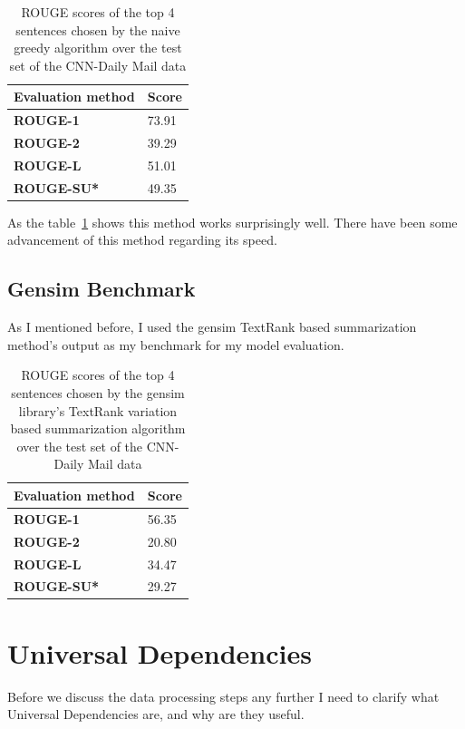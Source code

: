 \begin{table}[!ht]
	\centering
	\begin{tabular}{| l | l |}
		\hline
		\textbf{Evaluation method}&\textbf{Score}\\ \hline \hline
		\textbf{ROUGE-1}&73.91\\ \hline
		\textbf{ROUGE-2}&39.29 \\ \hline
		\textbf{ROUGE-L}&51.01 \\ \hline
		\textbf{ROUGE-SU*}&49.35 \\ \hline
	\end{tabular}
	\caption{ROUGE scores of the top 4 sentences chosen by the naive greedy algorithm over the test set of the CNN-Daily Mail data}
	\label{tab:extr}
\end{table}
As the table~\ref{tab:extr} shows this method works surprisingly well. There have been some advancement of this method regarding its speed\cite{GreedySum}.

\subsection{Gensim Benchmark}
As I mentioned before, I used the gensim TextRank based summarization method's output as my benchmark for my model evaluation.
\begin{table}[!ht]
	\centering
	\begin{tabular}{| l | l |}
		\hline
		\textbf{Evaluation method}&\textbf{Score}\\ \hline \hline
		\textbf{ROUGE-1}&56.35 \\ \hline
		\textbf{ROUGE-2}&20.80 \\ \hline
		\textbf{ROUGE-L}&34.47 \\ \hline
		\textbf{ROUGE-SU*}&29.27 \\ \hline
	\end{tabular}
	\caption{ROUGE scores of the top 4 sentences chosen by the gensim library's TextRank variation based summarization algorithm over the test set of the CNN-Daily Mail data}
\end{table}
\FloatBarrier
\section{Universal Dependencies}
Before we discuss the data processing steps any further I need to clarify what Universal Dependencies are, and why are they useful.

